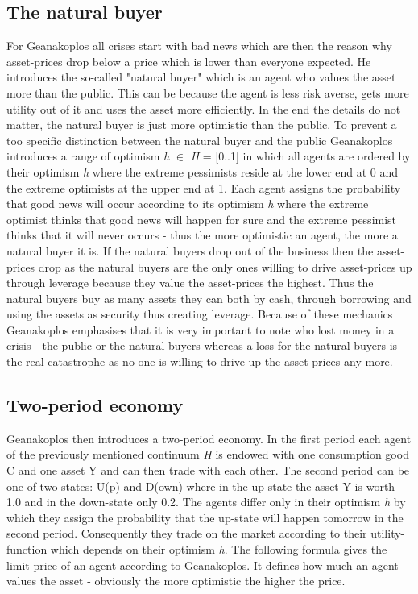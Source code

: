 \documentclass[../Bachelorarbeit.tex]{subfiles}
\begin{document}
\subsection{The natural buyer}
For Geanakoplos all crises start with bad news which are then the reason why asset-prices drop below a price which is lower than everyone expected. He introduces the so-called "natural buyer" which is an agent who values the asset more than the public. This can be because the agent is less risk averse, gets more utility out of it and uses the asset more efficiently. In the end the details do not matter, the natural buyer is just more optimistic than the public.
To prevent a too specific distinction between the natural buyer and the public Geanakoplos introduces a range of optimism \textit{h} $\in$ \textit{H} = [0..1] in which all agents are ordered by their optimism \textit{h} where the extreme pessimists reside at the lower end at 0 and the extreme optimists at the upper end at 1. Each agent assigns the probability that good news will occur according to its optimism \textit{h} where the extreme optimist thinks that good news will happen for sure and the extreme pessimist thinks that it will never occurs - thus the more optimistic an agent, the more a natural buyer it is. If the natural buyers drop out of the business then the asset-prices drop as the natural buyers are the only ones willing to drive asset-prices up through leverage because they value the asset-prices the highest. Thus the natural buyers buy as many assets they can both by cash, through borrowing and using the assets as security thus creating leverage. Because of these mechanics Geanakoplos emphasises that it is very important to note who lost money in a crisis - the public or the natural buyers whereas a loss for the natural buyers is the real catastrophe as no one is willing to drive up the asset-prices any more.

\subsection{Two-period economy}
Geanakoplos then introduces a two-period economy. In the first period each agent of the previously mentioned continuum \textit{H} is endowed with one consumption good C and one asset Y and can then trade with each other. The second period can be one of two states: U(p) and D(own) where in the up-state the asset Y is worth 1.0 and in the down-state only 0.2. The agents differ only in their optimism \textit{h} by which they assign the probability that the up-state will happen tomorrow in the second period. Consequently they trade on the market according to their utility-function which depends on their optimism \textit{h}. The following formula gives the limit-price of an agent according to Geanakoplos. It defines how much an agent values the asset - obviously the more optimistic the higher the price.
\end{document}
